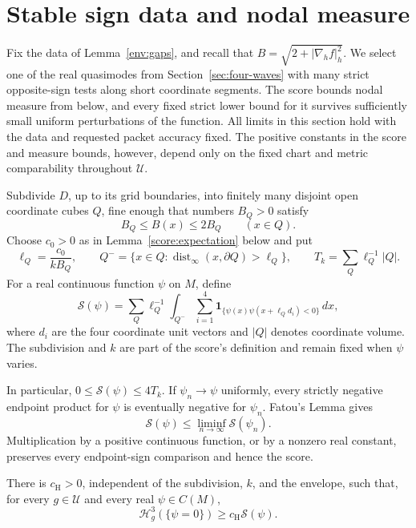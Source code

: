 \section{Stable sign data and nodal measure}
\label{sec:signs}

Fix the data of Lemma~\ref{env:gaps}, and recall that
$B=\sqrt{2+|\nabla_h f|_h^2}$. We select one of the real quasimodes
from Section~\ref{sec:four-waves} with many strict opposite-sign tests
along short coordinate segments. The score bounds nodal measure
from below, and every fixed strict lower bound for it survives
sufficiently small uniform perturbations of the function.
All limits in this section hold with the data and requested packet
accuracy fixed. The positive constants in the score and measure bounds,
however, depend only on the fixed chart and metric comparability
throughout $\mathcal U$.

\begin{definition}\label{score:definition}
Subdivide $D$, up to its grid boundaries, into finitely many disjoint
open coordinate cubes $Q$, fine enough that numbers $B_Q>0$ satisfy
\[
 B_Q\le B(x)\le 2B_Q\qquad (x\in Q).
\]
Choose $c_0>0$ as in Lemma~\ref{score:expectation} below and put
\[
 \ell_Q=\frac{c_0}{kB_Q},\qquad
 Q^- =\{x\in Q:\operatorname{dist}_{\infty}(x,\partial Q)>\ell_Q\},
 \qquad T_k=\sum_Q\ell_Q^{-1}|Q|.
\]
For a real continuous function $\psi$ on $M$, define
\begin{equation}\label{score:formula}
 \mathcal S(\psi)=\sum_Q\ell_Q^{-1}
 \int_{Q^-}\sum_{i=1}^4
 \mathbf 1_{\{\psi(x)\psi(x+\ell_Q d_i)<0\}}\,dx,
\end{equation}
where $d_i$ are the four coordinate unit vectors and $|Q|$ denotes
coordinate volume.  The subdivision and $k$ are part of the score's
definition and remain fixed when $\psi$ varies.
\end{definition}

In particular, $0\le\mathcal S(\psi)\le4T_k$.  If $\psi_n\to\psi$
uniformly, every strictly negative endpoint product for $\psi$ is
eventually negative for $\psi_n$.  Fatou's Lemma gives
\begin{equation}\label{score:lsc}
 \mathcal S(\psi)\le\liminf_{n\to\infty}\mathcal S(\psi_n).
\end{equation}
Multiplication by a positive continuous function, or by a nonzero real
constant, preserves every endpoint-sign comparison and hence the score.

\begin{lemma}\label{score:measure}
There is $c_{\mathrm H}>0$, independent of the subdivision, $k$, and
the envelope, such that, for every $g\in\mathcal U$ and every real
$\psi\in C(M)$,
\begin{equation}\label{score:hausdorff}
 \mathcal H_g^3(\{\psi=0\})\ge c_{\mathrm H}\mathcal S(\psi).
\end{equation}
\end{lemma}

